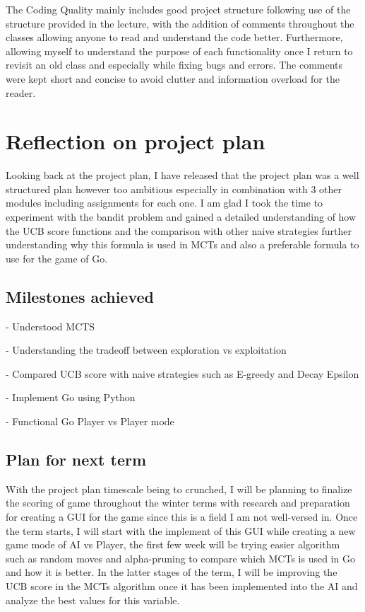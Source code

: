 \documentclass[]{final_report}
\begin{document}
The Coding Quality mainly includes good project structure following use of the structure provided in the lecture, with the addition of comments throughout the classes allowing anyone to read and understand the code better. Furthermore, allowing myself to understand the purpose of each functionality once I return to revisit an old class and especially while fixing bugs and errors. The comments were kept short and concise to avoid clutter and information overload for the reader. 

\section{Reflection on project plan}

Looking back at the project plan, I have released that the project plan was a well structured plan however too ambitious especially in combination with 3 other modules including assignments for each one. I am glad I took the time to experiment with the bandit problem and gained a detailed understanding of how the UCB score functions and the comparison with other naive strategies further understanding why this formula is used in MCTs and also a preferable formula to use for the game of Go. 

\subsection{Milestones achieved}

- Understood MCTS 

- Understanding the tradeoff between exploration vs exploitation

- Compared UCB score with naive strategies such as E-greedy and Decay Epsilon

- Implement Go using Python

- Functional Go Player vs Player mode

\subsection{Plan for next term}

With the project plan timescale being to crunched, I will be planning to finalize the scoring of game throughout the winter terms with research and preparation for creating a GUI for the game since this is a field I am not well-versed in. Once the term starts, I will start with the implement of this GUI while creating a new game mode of AI vs Player, the first few week will be trying easier algorithm such as random moves and alpha-pruning to compare which MCTs is used in Go and how it is better. In the latter stages of the term, I will be improving the UCB score in the MCTs algorithm once it has been implemented into the AI and analyze the best values for this variable. 
\end{document}
